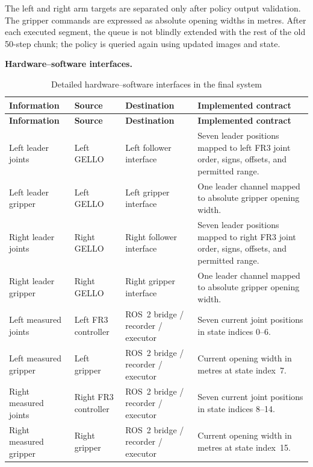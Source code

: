 The left and right arm targets are separated only after policy output validation. The gripper commands are expressed as absolute opening widths in metres. After each executed segment, the queue is not blindly extended with the rest of the old 50-step chunk; the policy is queried again using updated images and state.

\medskip
\noindent\textbf{Hardware--software interfaces.}

\begingroup
\small
\setlength{\tabcolsep}{3pt}
\renewcommand{\arraystretch}{1.08}
\begin{longtable}{
  >{\raggedright\arraybackslash}p{}
  >{\raggedright\arraybackslash}p{}
  >{\raggedright\arraybackslash}p{}
  >{\raggedright\arraybackslash}p{}}
  \caption{Detailed hardware--software interfaces in the final system}
  \label{tab:ch4-detailed-interfaces}\\
  \toprule
  \textbf{Information} & \textbf{Source} & \textbf{Destination} & \textbf{Implemented contract} \\
  \midrule
  \endfirsthead
  \toprule
  \textbf{Information} & \textbf{Source} & \textbf{Destination} & \textbf{Implemented contract} \\
  \midrule
  \endhead
  Left leader joints & Left GELLO & Left follower interface & Seven leader positions mapped to left FR3 joint order, signs, offsets, and permitted range. \\
  Left leader gripper & Left GELLO & Left gripper interface & One leader channel mapped to absolute gripper opening width. \\
  Right leader joints & Right GELLO & Right follower interface & Seven leader positions mapped to right FR3 joint order, signs, offsets, and permitted range. \\
  Right leader gripper & Right GELLO & Right gripper interface & One leader channel mapped to absolute gripper opening width. \\
  Left measured joints & Left FR3 controller & ROS~2 bridge / recorder / executor & Seven current joint positions in state indices 0--6. \\
  Left measured gripper & Left gripper & ROS~2 bridge / recorder / executor & Current opening width in metres at state index~7. \\
  Right measured joints & Right FR3 controller & ROS~2 bridge / recorder / executor & Seven current joint positions in state indices 8--14. \\
  Right measured gripper & Right gripper & ROS~2 bridge / recorder / executor & Current opening width in metres at state index~15. \\

\end{longtable}
